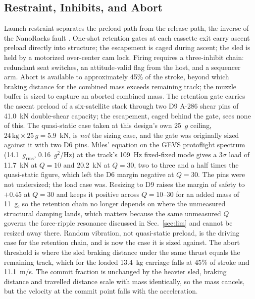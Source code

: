 \documentclass[conference]{IEEEtran}
\begin{document}
\subsection{Restraint, Inhibits, and Abort}
Launch restraint separates the preload path from the release path, the inverse of the NanoRacks fault \cite{lewis}. One-shot retention gates at each cassette exit carry ascent preload directly into structure; the escapement is caged during ascent; the sled is held by a motorized over-center cam lock. Firing requires a three-inhibit chain: redundant seat switches, an attitude-valid flag from the host, and a sequencer arm. Abort is available to approximately 45\% of the stroke, beyond which braking distance for the combined mass exceeds remaining track; the muzzle buffer is sized to capture an aborted combined mass. The retention gate carries the ascent preload of a six-satellite stack through two D9 A-286 shear pins of 41.0~kN double-shear capacity; the escapement, caged behind the gate, sees none of this. The quasi-static case taken at this design's own 25~$g$ ceiling, $24\,\mathrm{kg}\times25\,g=5.9$~kN, is \emph{not} the sizing case, and the gate was originally sized against it with two D6 pins. Miles' equation on the GEVS protoflight spectrum (14.1~$g_\mathrm{rms}$, 0.16~$g^2$/Hz) at the track's 109~Hz fixed-fixed mode gives a 3$\sigma$ load of 11.7~kN at $Q=10$ and 20.2~kN at $Q=30$, two to three and a half times the quasi-static figure, which left the D6 margin negative at $Q=30$. The pins were not undersized; the load case was. Resizing to D9 raises the margin of safety to $+0.45$ at $Q=30$ and keeps it positive across $Q=10$--$30$ for an added mass of 11~g, so the retention chain no longer depends on where the unmeasured structural damping lands, which matters because the same unmeasured $Q$ governs the force-ripple resonance discussed in Sec.~\ref{sec:lim} and cannot be resized away there. Random vibration, not quasi-static preload, is the driving case for the retention chain, and is now the case it is sized against. The abort threshold is where the sled braking distance under the same thrust equals the remaining track, which for the loaded 13.4~kg carriage falls at 45\% of stroke and 11.1~m/s. The commit fraction is unchanged by the heavier sled, braking distance and travelled distance scale with mass identically, so the mass cancels, but the velocity at the commit point falls with the acceleration.
\end{document}
